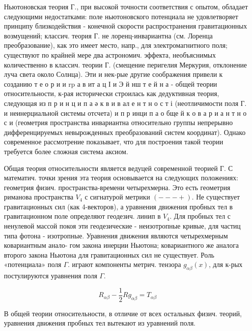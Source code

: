 \documentclass[10pt]{article}
\begin{document}
Ньютоновская теория Г., при высокой точности соответствия с опытом, обладает следующими недостатками: поле ньютоновского потенциала не удовлетворяет принципу близкодействия - конечной скорости распространения гравитационных возмущений; классич. теория Г. не лоренц-инвариантна (см. Лоренца преобразование), как это имеет место, напр., для электромагнитного поля; существуют по крайней мере два астрономич. эффекта, необъяснимых количественно в классич. теории Г. (смещение перигелия Меркурия, отклонение луча света около Солнца). Эти и нек-рые другие соображения привели к созданию т е о р и и $\mathrm{r} \mathrm{p}$ а в ит а ц І и Э й нш т е й н а - общей теории относительности, к-рая исторически строилась как дедуктивная теория, следующая из п р и н ц и п а ә к в и в ал е н т н о с т і (неотличимости поля Г. и неинерциальной системы отсчета) и п р инци п а о бще й к о в а р и а н т н о с и (геометрия пространства инвариантна относительно группы непрерывно дифференцируемых невырожденных преобразований систем координат). Однако современное рассмотрение показывает, что для построения такой теории требуется более сложная система аксиом.



Общая теория относительности является ведуцей современной теорией Г. С математич. точки зрения эта теория основывается на следующих положениях: геометрия физич. пространства-времени четырехмерна. Это есть геометрия риманова пространства $V_{4}$ с сигнатурой метрики $(---+)$. Не существует гравитационных сил (как 4-векторов), а уравнения движения пробных тел в гравитационном поле определяют геодезич. линип в $V_{4}$. Для пробных тел с ненулевой массой покоя эти геодезические - неизотропные кривые, для частиц типа фотона - изотропные. Уравнения движения являются четырехмерным ковариантным анало- гом закона инерции Ньютона; ковариантного же аналога второго закона Ньютона для гравитационных сил не существует. Роль «потенциала» поля $\Gamma$. играют компоненты метрич. тензора $g_{\alpha \beta}(x)$, для к-рых постулируются уравнения поля $\Gamma$.



\[

R_{\alpha \beta}-\frac{1}{2} R g_{\alpha \beta}=T_{\alpha \beta}

\]



В общей теории относительности, в отличие от всех остальных физич. теорий, уравнения движения пробных тел вытекают из уравнений поля.
\end{document}

